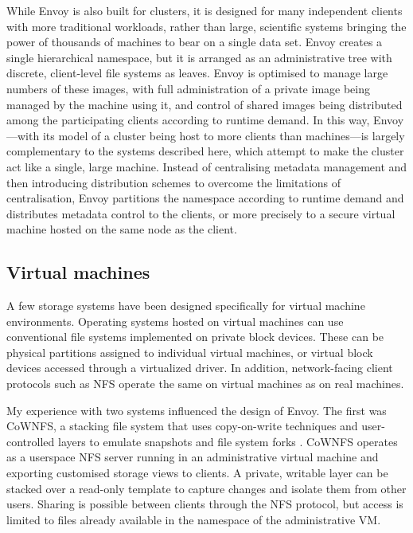 While Envoy is also built for clusters, it is designed for many independent clients with more traditional workloads, rather than large, scientific systems bringing the power of thousands of machines to bear on a single data set. Envoy creates a single hierarchical namespace, but it is arranged as an administrative tree with discrete, client-level file systems as leaves. Envoy is optimised to manage large numbers of these images, with full administration of a private image being managed by the machine using it, and control of shared images being distributed among the participating clients according to runtime demand. In this way, Envoy---with its model of a cluster being host to more clients than machines---is largely complementary to the systems described here, which attempt to make the cluster act like a single, large machine. Instead of centralising metadata management and then introducing distribution schemes to overcome the limitations of centralisation, Envoy partitions the namespace according to runtime demand and distributes metadata control to the clients, or more precisely to a secure virtual machine hosted on the same node as the client.

\subsection{Virtual machines}

A few storage systems have been designed specifically for virtual machine environments. Operating systems hosted on virtual machines can use conventional file systems implemented on private block devices. These can be physical partitions assigned to individual virtual machines, or virtual block devices accessed through a virtualized driver. In addition, network-facing client protocols such as NFS operate the same on virtual machines as on real machines.

My experience with two systems influenced the design of Envoy. The first was CoWNFS, a stacking file system that uses copy-on-write techniques and user-controlled layers to emulate snapshots and file system forks \cite{kotsovinos04b}. CoWNFS operates as a userspace NFS server running in an administrative virtual machine and exporting customised storage views to clients. A private, writable layer can be stacked over a read-only template to capture changes and isolate them from other users. Sharing is possible between clients through the NFS protocol, but access is limited to files already available in the namespace of the administrative VM.

